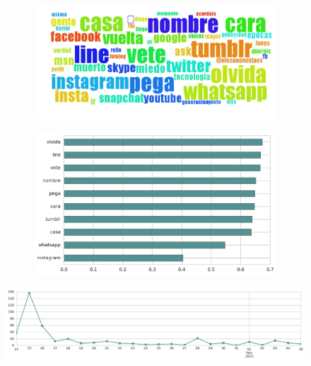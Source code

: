 \begin{figure}[htbp!]
    \centering
    \begin{subfigure}[b]{0.49\textwidth}
        \includegraphics[width=\textwidth]{twitter_all/report_images/topic-01-wordcloud.jpg}
    \end{subfigure}
    \begin{subfigure}[b]{0.49\textwidth}
        \includegraphics[width=\textwidth]{twitter_all/report_images/topic-01-terms.jpg}
    \end{subfigure}
\end{figure}

\begin{figure}[htbp!]
    \centering
    \includegraphics[width=\textwidth]{twitter_all/report_images/topic-01-timeseries.jpg}
\end{figure}

